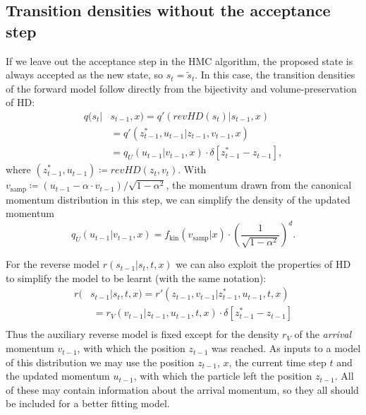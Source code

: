 \subsection{Transition densities without the acceptance step}
\label{sec:TransitionDensitiesNoAcceptance}
If we leave out the acceptance step in the HMC algorithm, the proposed state is always accepted as the new state, so $s_t = \tilde{s}_t$. In this case, the transition densities of the forward model follow directly from the bijectivity and volume-preservation of HD:
\begin{equation} \label{eq:ForwardTransitionNoAcceptance}
\begin{split}
q(s_t|&s_{t-1}, x) = q'(revHD(s_t)|s_{t-1}, x) \\
&= q'(z^*_{t-1}, u_{t-1} |z_{t-1}, v_{t-1}, x) \\
&= q_U(u_{t-1}|v_{t-1}, x) \cdot \delta[{z}^*_{t-1} - z_{t-1}],
\end{split}
\end{equation}
where $(z^*_{t-1}, u_{t-1}) \coloneqq revHD(z_t, v_t)$. With $v_{\textrm{samp}} \coloneqq (u_{t-1} - \alpha \cdot v_{t-1})/{\sqrt{1 - \alpha^2}}$, the momentum drawn from the canonical momentum distribution in this step, we can simplify the density of the updated momentum
\begin{equation} \label{eq:qUDefinition}
q_U(u_{t-1}|v_{t-1}, x) = f_\textrm{kin}(v_{\textrm{samp}}|x) \cdot (\frac{1}{\sqrt{1 - \alpha^2}})^{d}.
\end{equation}

For the reverse model $r(s_{t-1}|s_t, t, x)$ we can also exploit the properties of HD to simplify the model to be learnt (with the same notation):
\begin{equation} \label{eq:ReverseTransitionNoAcceptance}
\begin{split}
r(&s_{t-1}|s_{t}, t, x) = r'(z_{t-1}, v_{t-1} |z^*_{t-1}, u_{t-1},t , x) \\
&\;= r_V(v_{t-1}|z_{t-1}, u_{t-1}, t, x) \cdot \delta[z^*_{t-1} - z_{t-1}] \\
\end{split}
\end{equation}
Thus the auxiliary reverse model is fixed except for the density $r_V$ of the \textit{arrival} momentum $v_{t-1}$, with which the position $z_{t-1}$ was reached. As inputs to a model of this distribution we may use the position $z_{t-1}$, $x$, the current time step $t$ and the updated momentum $u_{t-1}$, with which the particle left the position $z_{t-1}$. All of these may contain information about the arrival momentum, so they all should be included for a better fitting model.

